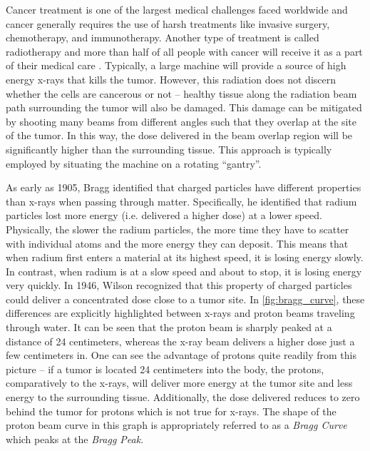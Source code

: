 Cancer treatment is one of the largest medical challenges faced worldwide and cancer generally requires the use of harsh treatments like invasive surgery, chemotherapy, and immunotherapy. Another type of treatment is called radiotherapy and more than half of all people with cancer will receive it as a part of their medical care \cite{Mayo_2024_Cancer}. Typically, a large machine will provide a source of high energy x-rays that kills the tumor. However, this radiation does not discern whether the cells are cancerous or not -- healthy tissue along the radiation beam path surrounding the tumor will also be damaged. This damage can be mitigated by shooting many beams from different angles such that they overlap at the site of the tumor. In this way, the dose delivered in the beam overlap region will be significantly higher than the surrounding tissue. This approach is typically employed by situating the machine on a rotating ``gantry''.

As early as 1905, Bragg \cite{Bragg_1905_JOS} identified that charged particles have different properties than x-rays when passing through matter. Specifically, he identified that radium particles lost more energy (i.e. delivered a higher dose) at a lower speed. Physically, the slower the radium particles, the more time they have to scatter with individual atoms and the more energy they can deposit. This means that when radium first enters a material at its highest speed, it is losing energy slowly. In contrast, when radium is at a slow speed and about to stop, it is losing energy very quickly. In 1946, Wilson \cite{Wilson_1946_Rad} recognized that this property of charged particles could deliver a concentrated dose close to a tumor site. In \autoref{fig:bragg_curve}, these differences are explicitly highlighted between x-rays and proton beams traveling through water. It can be seen that the proton beam is sharply peaked at a distance of 24 centimeters, whereas the x-ray beam delivers a higher dose just a few centimeters in. One can see the advantage of protons quite readily from this picture -- if a tumor is located 24 centimeters into the body, the protons, comparatively to the x-rays, will deliver more energy at the tumor site and less energy to the surrounding tissue. Additionally, the dose delivered reduces to zero behind the tumor for protons which is not true for x-rays. The shape of the proton beam curve in this graph is appropriately referred to as a \emph{Bragg Curve} which peaks at the \emph{Bragg Peak}. 

